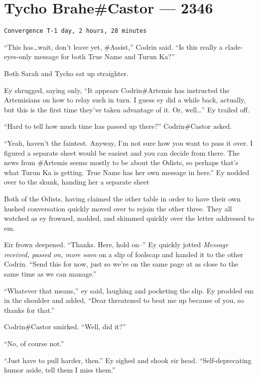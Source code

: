 \hypertarget{tycho-brahecastor-2346}{%
\chapter{Tycho Brahe\#Castor — 2346}\label{tycho-brahecastor-2346}}

\begin{verbatim}
Convergence T-1 day, 2 hours, 28 minutes
\end{verbatim}

``This has\ldots wait, don't leave yet, \#Assist,'' Codrin said. ``Is this really a clade-eyes-only message for both True Name and Turun Ka?''

Both Sarah and Tycho sat up straighter.

Ey shrugged, saying only, ``It appears Codrin\#Artemis has instructed the Artemisians on how to relay such in turn. I guess ey did a while back, actually, but this is the first time they've taken advantage of it. Or, well\ldots{}'' Ey trailed off.

``Hard to tell how much time has passed up there?'' Codrin\#Castor asked.

``Yeah, haven't the faintest. Anyway, I'm not sure how you want to pass it over. I figured a separate sheet would be easiest and you can decide from there. The news from \#Artemis seems mostly to be about the Odists, so perhaps that's what Turun Ka is getting. True Name has her own message in here.'' Ey nodded over to the skunk, handing her a separate sheet

Both of the Odists, having claimed the other table in order to have their own hushed conversation quickly moved over to rejoin the other three. They all watched as ey frowned, nodded, and skimmed quickly over the letter addressed to em.

Eir frown deepened. ``Thanks. Here, hold on--'' Ey quickly jotted \emph{Message received, passed on, more soon} on a slip of foolscap and handed it to the other Codrin. ``Send this for now, just so we're on the same page at as close to the same time as we can manage.''

``Whatever that means,'' ey said, laughing and pocketing the slip. Ey prodded em in the shoulder and added, ``Dear threatened to beat me up because of you, so thanks for that.''

Codrin\#Castor smirked. ``Well, did it?''

``No, of course not.''

``Just have to pull harder, then.'' Ey sighed and shook eir head. ``Self-deprecating humor aside, tell them I miss them.''

